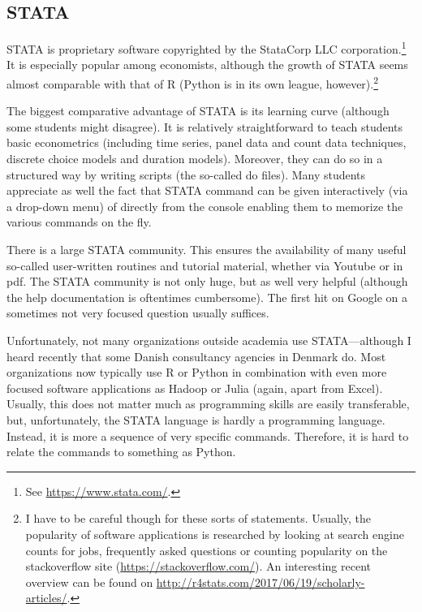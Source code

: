 \documentclass[fleqn,10pt]{SelfArx} %
\begin{document}
\subsection*{STATA}

STATA is proprietary software copyrighted by the StataCorp LLC corporation.\footnote{See \href{https://www.stata.com}{https://www.stata.com/}.} It is especially popular among economists, although the growth of STATA seems almost comparable with that of R (Python is in its own league, however).\footnote{I have to be careful though for these sorts of statements. Usually, the popularity of software applications is researched by looking at search engine counts for jobs, frequently asked questions or counting popularity on the stackoverflow site (\href{https://stackoverflow.com/}{https://stackoverflow.com/}). An interesting recent overview can be found on \href{http://r4stats.com/2017/06/19/scholarly-articles/}{http://r4stats.com/2017/06/19/scholarly-articles/}.}

The biggest comparative advantage of STATA is its learning curve (although some students might disagree). It is relatively straightforward to teach students basic econometrics (including time series, panel data and count data techniques, discrete choice models and duration models). Moreover, they can do so in a structured way by writing scripts (the so-called do files). Many students appreciate as well the fact that STATA command can be given interactively (via a drop-down menu) of directly from the console enabling them to memorize the various commands on the fly. 

There is a large STATA community. This ensures the availability of many useful so-called user-written routines and tutorial material, whether via Youtube or in pdf. The STATA community is not only huge, but as well very helpful (although the help documentation is oftentimes cumbersome). The first hit on Google on a sometimes not very focused question usually suffices.

Unfortunately, not many organizations outside academia use STATA---although I heard recently that some Danish consultancy agencies in Denmark do. Most organizations now typically use R or Python in combination with even more focused software applications as Hadoop or Julia (again, apart from Excel). Usually, this does not matter much as programming skills are easily transferable, but, unfortunately, the STATA language is hardly a programming language. Instead, it is more a sequence of very specific commands. Therefore, it is hard to relate the commands to something as Python.
\end{document}
